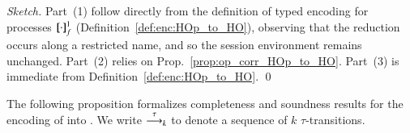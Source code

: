 \begin{proof}[Sketch]
	Part~(1) follow directly from the definition of typed encoding for processes $[\!\![\cdot]\!\!]^{1}_{f}$ (Definition~\ref{def:enc:HOp_to_HO}),
	observing that the reduction occurs along a restricted name, and so the session environment remains unchanged.
	Part~(2) relies on  Prop.~\ref{prop:op_corr_HOp_to_HO}.
	Part~(3) is immediate from Definition~\ref{def:enc:HOp_to_HO}.
	\qed
\end{proof}


The following proposition formalizes completeness and soundness results for the encoding of 
\HOp into \HO.
We write $\stackrel{\tau}{\longrightarrow}_k$ to denote a sequence of $k$ $\tau$-transitions.

